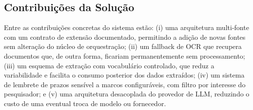 \documentclass[12pt]{article}
\begin{document}
  \subsection{Contribuições da Solução}
  Entre as contribuições concretas do sistema estão: (i) uma arquitetura multi-fonte com um contrato de extensão documentado, permitindo a adição de novas fontes sem alteração do núcleo de orquestração; (ii) um fallback de OCR que recupera documentos que, de outra forma, ficariam permanentemente sem processamento; (iii) um esquema de extração com vocabulário controlado, que reduz a variabilidade e facilita o consumo posterior dos dados extraídos; (iv) um sistema de lembrete de prazos sensível a marcos configuráveis, com filtro por interesse do pesquisador; e (v) uma arquitetura desacoplada do provedor de LLM, reduzindo o custo de uma eventual troca de modelo ou fornecedor.
\end{document}
